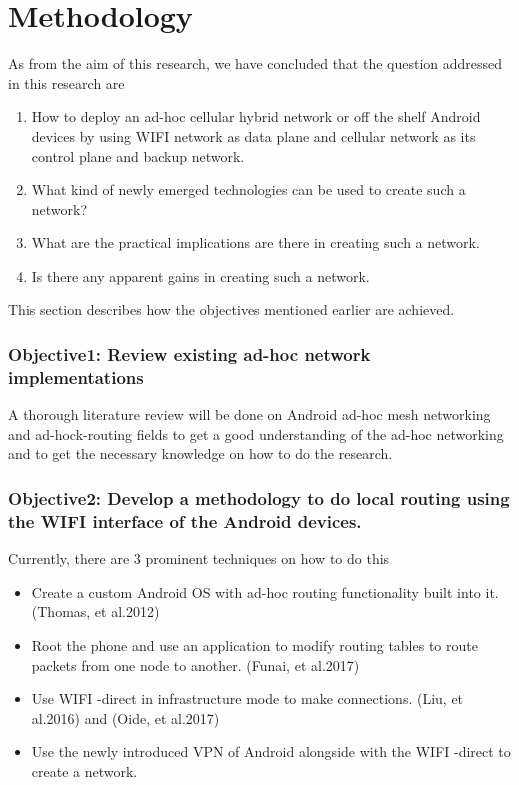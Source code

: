 \vspace{12pt}


\clearpage
\section{Methodology}
\vspace{12pt}
As from the aim of this research, we have concluded that the question addressed in this research are 
\begin{enumerate}
  \item How to deploy an ad-hoc cellular hybrid network or off the shelf Android devices by using  WIFI  network as data plane and cellular network as its control plane and backup network.
  \item What kind of newly emerged technologies can be used to create such a network?
  \item What are the practical implications are there in creating such a network.
  \item Is there any apparent gains in creating such a network.
\end{enumerate}
\vspace{12pt}
This section describes how the objectives mentioned earlier are achieved.
\vspace{12pt}
\subsubsection{Objective1: Review existing ad-hoc network implementations } 
A thorough literature review will be done on Android ad-hoc mesh networking and ad-hock-routing fields to get a good understanding of the ad-hoc networking and to get the necessary knowledge on how to do the research.

\vspace{12pt}
\subsubsection{Objective2: Develop a methodology to do local routing using the  WIFI  interface of the Android  devices.}
\vspace{12pt}
Currently, there are 3 prominent techniques on how to do this

\begin{itemize}
  \item Create a custom Android OS with ad-hoc routing functionality built into it. (Thomas, et al.2012)\cite{defcon_paper}
  \item Root the phone and use an application to modify routing tables to route packets from one node to another. (Funai, et al.2017)\cite{wifi-direct_and_hotspot}
  \item Use  WIFI  -direct in infrastructure mode to make connections. (Liu, et al.2016)\cite{GO} and (Oide, et al.2017)\cite{wif_direct_with_relay_nodes}
  \item Use the newly introduced VPN of Android  alongside with the  WIFI  -direct to create a network.
\end{itemize}
\vspace{12pt}

